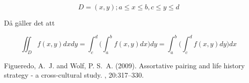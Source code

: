 \documentclass[12pt]{article} %
\begin{document}
\[
    D = {(x,y); a \leq x \leq b, c \leq y \leq d}
\]

Då gäller det att 

\[
    \iint_D f(x,y) dx dy = \int_{c}^{d} \bigg( \int_{a}^{b} f(x,y)dx \bigg)dy = \int_{a}^{b} \bigg(\int_{c}^{d} f(x,y)dy \bigg)dx
\] 


\begin{thebibliography}{99} %

Figueredo, A.~J. and Wolf, P. S.~A. (2009).
\newblock Assortative pairing and life history strategy - a cross-cultural
  study.
, 20:317--330.
 
\end{thebibliography}

\end{document}
